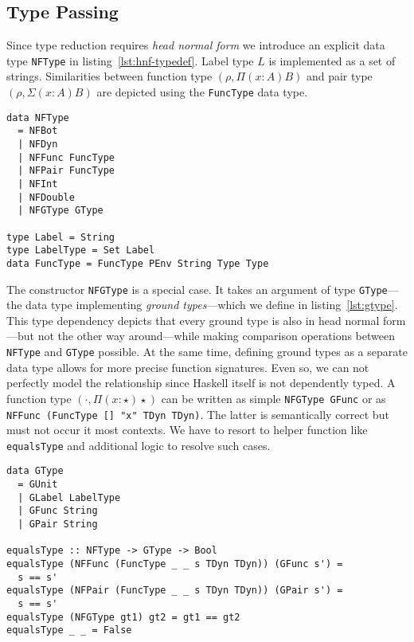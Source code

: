 \subsection{Type Passing}

Since type reduction requires \emph{head normal form} we introduce an explicit data type \texttt{NFType} in listing~\ref{lst:hnf-typedef}. Label type $L$ is implemented as a set of strings. Similarities between function type $(\rho, \Pi(x:A)B)$ and pair type $(\rho, \Sigma(x:A)B)$ are  depicted using the \texttt{FuncType} data type.

\begin{lstlisting}[float,
  label=lst:hnf-typedef,
  caption=HNF type definition (\texttt{ProcessEnvironment.hs})]
data NFType
  = NFBot
  | NFDyn
  | NFFunc FuncType
  | NFPair FuncType
  | NFInt
  | NFDouble
  | NFGType GType

type Label = String
type LabelType = Set Label
data FuncType = FuncType PEnv String Type Type
\end{lstlisting}

The constructor \texttt{NFGType} is a special case. It takes an argument of type \texttt{GType}---the data type implementing \emph{ground types}---which we define in listing~\ref{lst:gtype}. This type dependency depicts that every ground type is also in head normal form---but not the other way around---while making comparison operations between \texttt{NFType} and \texttt{GType} possible. At the same time, defining ground types as a separate data type allows for more precise function signatures. Even so, we can not perfectly model the relationship since Haskell itself is not dependently typed. A function type $(\cdot, \Pi(x:\star)\star)$ can be written as simple \texttt{NFGType GFunc} or as \texttt{NFFunc (FuncType [] "x" TDyn TDyn)}. The latter is semantically correct but must not occur it most contexts. We have to resort to helper function like \texttt{equalsType} and additional logic to resolve such cases.

\begin{lstlisting}[float,
  caption=Ground type definition (\texttt{ProcessEnvironment.hs}),
  label=lst:gtype]
data GType
  = GUnit
  | GLabel LabelType
  | GFunc String
  | GPair String

equalsType :: NFType -> GType -> Bool
equalsType (NFFunc (FuncType _ _ s TDyn TDyn)) (GFunc s') =
  s == s'
equalsType (NFPair (FuncType _ _ s TDyn TDyn)) (GPair s') =
  s == s'
equalsType (NFGType gt1) gt2 = gt1 == gt2
equalsType _ _ = False
\end{lstlisting}

